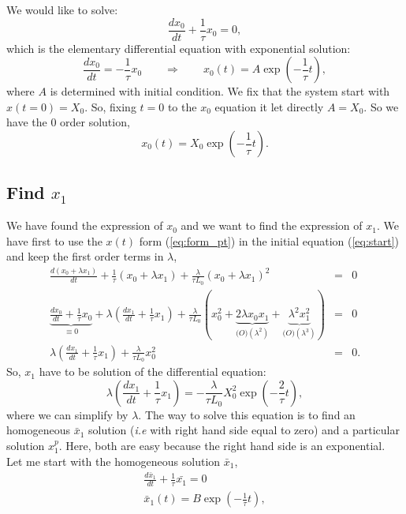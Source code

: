 \documentclass[a4paper,10pt]{article}
\begin{document}
We would like to solve:
\begin{equation}
\frac{dx_0}{dt} + \frac{1}{\tau}x_0 = 0,
\end{equation}
which is the elementary differential equation with exponential solution:
\begin{equation}
\frac{dx_0}{dt} = -\frac{1}{\tau}x_0 \qquad \Rightarrow \qquad x_0(t) = A\exp\left(-\frac{1}{\tau}t\right),
\end{equation}
where $A$ is determined with initial condition. We fix that the system start with $x(t=0)=X_0$. So, fixing $t=0$ to the $x_0$ equation it let directly $A=X_0$. So we have the 0 order solution,
\begin{equation}
x_0(t) = X_0\exp\left(-\frac{1}{\tau}t\right) .
\end{equation}

\subsection{Find $x_1$}
We have found the expression of $x_0$ and we want to find the expression of $x_1$. We have first to use the $x(t)$ form (\ref{eq:form_pt}) in the initial equation (\ref{eq:start}) and keep the first order terms in $\lambda$,
\begin{eqnarray}
\frac{d(x_0 + \lambda x_1 ) }{dt} + \frac{1}{\tau}(x_0 + \lambda x_1 ) + \frac{\lambda}{\tau L_0}(x_0 + \lambda x_1 )^2 &=& 0 \\
\underbrace{\frac{dx_0}{dt}  + \frac{1}{\tau}x_0}_{\equiv 0} +   \lambda\left( \frac{dx_1}{dt}  + \frac{1}{\tau}x_1 \right)+ \frac{\lambda}{\tau L_0}(x_0^2 + \underbrace{2\lambda x_0 x_1}_{\mathcal(O)(\lambda^2)} + \underbrace{\lambda^2x_1^2}_{\mathcal(O)(\lambda^3)} ) &=& 0 \\
 \lambda\left( \frac{dx_1}{dt}  + \frac{1}{\tau}x_1 \right)+ \frac{\lambda}{\tau L_0}x_0^2 &=& 0.
\end{eqnarray}
So, $x_1$ have to be solution of the differential equation:
\begin{equation}
 \lambda\left( \frac{dx_1}{dt}  + \frac{1}{\tau}x_1 \right) = -\frac{\lambda}{\tau L_0}X_0^2\exp\left(-\frac{2}{\tau}t\right),
\end{equation}
where we can simplify by $\lambda$. The way to solve this equation is to find an homogeneous $\bar{x}_1$ solution (\textit{i.e} with right hand side equal to zero) and a particular solution $x_1^p$. Here, both are easy because the right hand side is an exponential. Let me start with the homogeneous solution $\bar{x}_1$,
\begin{eqnarray}
\frac{d\bar{x}_1}{dt}  + \frac{1}{\tau}\bar{x_1} = 0\\
\bar{x}_1(t) = B \exp\left(-\frac{1}{\tau}t\right),
\end{eqnarray}
\end{document}
